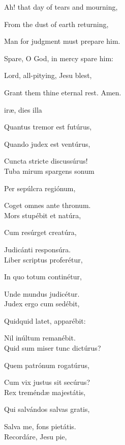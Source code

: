 {\begin{multicols}{2}
\begin{hangparas}{1.25em}{1}
\columnbreak
\par\noindent
Ah! that day of tears and mourning,\par\noindent
From the dust of earth returning,\par\noindent
Man for judgment must prepare him.\\
\par\noindent
Spare, O God, in mercy spare him:\par\noindent
Lord, all-pitying, Jesu blest,\par\noindent
Grant them thine eternal rest. Amen.
\end{hangparas}
\end{multicols}
}
{ ir{\ae}, dies illa\par
{}
Quantus tremor est futúrus,

Quando judex est ventúrus,

Cuncta stricte discussúrus!\\

Tuba mirum spargens sonum

Per sepúlcra regiónum,

Coget omnes ante thronum.\\

Mors stupébit et natúra,

Cum resúrget creatúra,

Judicánti responsúra.\\

Liber scriptus proferétur,

In quo totum continétur,

Unde mundus judicétur.\\

Judex ergo cum sedébit,

Quidquid latet, apparébit:

Nil inúltum remanébit.\\

Quid sum miser tunc dictúrus?

Quem patrónum rogatúrus,

Cum vix justus sit secúrus?\\

Rex treménd{\ae} majestátis,

Qui salvándos salvas gratis,

Salva me, fons pietátis.\\

Recordáre, Jesu pie,

}
